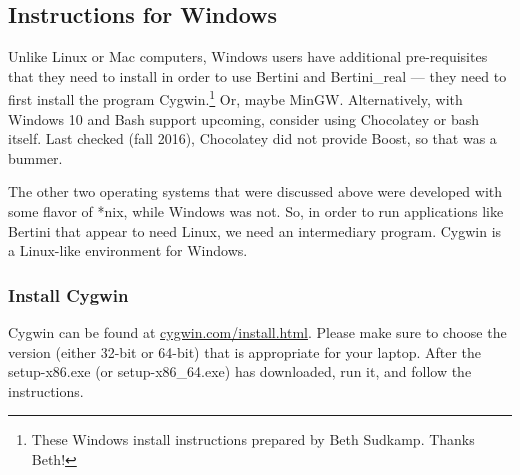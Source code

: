 \subsection{Instructions for Windows}
Unlike Linux or Mac computers, Windows users have additional pre-requisites that they need to install in order to use Bertini and Bertini\_real --- they need to first install the program Cygwin.\footnote{These Windows install instructions prepared by Beth Sudkamp.  Thanks Beth!}  Or, maybe MinGW.  Alternatively, with Windows 10 and Bash support upcoming, consider using Chocolatey or bash itself.  Last checked (fall 2016), Chocolatey did not provide Boost, so that was a bummer.  


The other two operating systems that were discussed above were developed with some flavor of *nix, while Windows was not. So, in order to run applications like Bertini that appear to need Linux, we need an intermediary program. Cygwin is a Linux-like environment for Windows. 


	\subsubsection{Install Cygwin}

Cygwin can be found at \href{https://cygwin.com/install.html}{cygwin.com/install.html}. Please make sure to choose the version (either 32-bit or 64-bit) that is appropriate for your laptop. After the setup-x86.exe (or setup-x86\_64.exe) has downloaded, run it, and follow the instructions.

